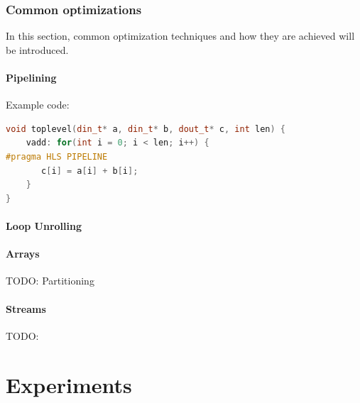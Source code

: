 \documentclass[a4paper, twoside]{report}
\theoremstyle{definition}
\numberwithin{equation}{section}
\begin{document}
\subsection{Common optimizations}

In this section, common optimization techniques and how they are achieved will be introduced.




\subsubsection{Pipelining}


Example code:
\begin{lstlisting}[language=c++,numbers=none]
void toplevel(din_t* a, din_t* b, dout_t* c, int len) {
	vadd: for(int i = 0; i < len; i++) {
#pragma HLS PIPELINE
	   c[i] = a[i] + b[i];
	}
}
\end{lstlisting}

\subsubsection{Loop Unrolling}


\subsubsection{Arrays}

TODO: Partitioning

\subsubsection{Streams}

TODO:





\chapter{Experiments}
\end{document}
